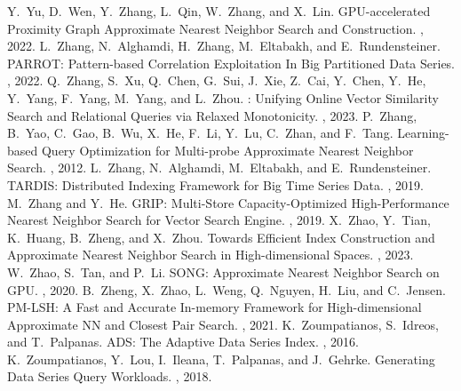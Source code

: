 \documentclass[11pt]{article}
\begin{document}
\begin{thebibliography}{10}
\begin{footnotesize}
Y.~Yu, D.~Wen, Y.~Zhang, L.~Qin, W.~Zhang, and X.~Lin. \newblock  GPU-accelerated Proximity Graph Approximate Nearest Neighbor Search and Construction. , 2022.  
L.~Zhang, N.~Alghamdi, H.~Zhang, M.~Eltabakh, and E.~Rundensteiner. \newblock PARROT: Pattern-based Correlation Exploitation In Big Partitioned Data Series. , 2022.
Q.~Zhang, S.~Xu, Q.~Chen, G.~Sui, J.~Xie, Z.~Cai, Y.~Chen, Y.~He, Y.~Yang, F.~Yang, M.~Yang, and L.~Zhou. : Unifying Online Vector Similarity Search and Relational Queries via Relaxed Monotonicity. , 2023.
P.~Zhang, B.~Yao, C.~Gao, B.~Wu, X.~He, F.~Li, Y.~Lu, C.~Zhan, and F.~Tang. \newblock Learning-based Query Optimization for Multi-probe Approximate Nearest Neighbor Search. , 2012.
L.~Zhang, N.~Alghamdi, M.~Eltabakh, and E.~Rundensteiner. \newblock  TARDIS: Distributed Indexing Framework for Big Time Series Data. , 2019.
M.~Zhang and Y.~He. \newblock  GRIP: Multi-Store Capacity-Optimized High-Performance
Nearest Neighbor Search for Vector Search Engine. , 2019.
X.~Zhao, Y.~Tian, K.~Huang, B.~Zheng, and X.~Zhou. \newblock Towards Efficient Index Construction and Approximate Nearest Neighbor Search in High-dimensional Spaces. , 2023.
W.~Zhao, S.~Tan, and P.~Li. \newblock  SONG: Approximate Nearest Neighbor Search on GPU. , 2020.
 B.~Zheng, X.~Zhao, L.~Weng, Q.~Nguyen, H.~Liu, and C.~Jensen. \newblock PM-LSH: A Fast and Accurate In-memory Framework for High-dimensional Approximate NN and Closest Pair Search. , 2021.
K.~Zoumpatianos, S.~Idreos, and T.~Palpanas. \newblock ADS: The Adaptive Data Series Index. , 2016.
K.~Zoumpatianos, Y.~Lou, I.~Ileana, T.~Palpanas, and J.~Gehrke. \newblock Generating Data Series Query Workloads. , 2018.  
  
\end{footnotesize}
\end{thebibliography}

 
\end{document}

